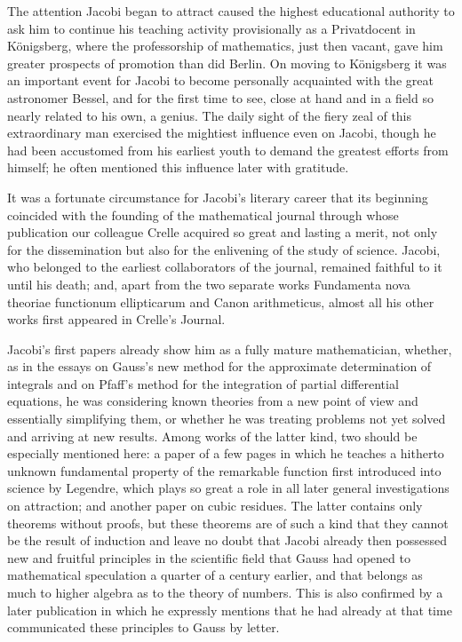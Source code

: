 \documentclass[11pt]{article}
\begin{document}
The attention Jacobi began to attract caused the highest educational authority to ask him to continue his teaching activity provisionally as a Privatdocent in Königsberg, where the professorship of mathematics, just then vacant, gave him greater prospects of promotion than did Berlin. On moving to Königsberg it was an important event for Jacobi to become personally acquainted with the great astronomer Bessel, and for the first time to see, close at hand and in a field so nearly related to his own, a genius. The daily sight of the fiery zeal of this extraordinary man exercised the mightiest influence even on Jacobi, though he had been accustomed from his earliest youth to demand the greatest efforts from himself; he often mentioned this influence later with gratitude.

It was a fortunate circumstance for Jacobi's literary career that its beginning coincided with the founding of the mathematical journal through whose publication our colleague Crelle acquired so great and lasting a merit, not only for the dissemination but also for the enlivening of the study of science. Jacobi, who belonged to the earliest collaborators of the journal, remained faithful to it until his death; and, apart from the two separate works Fundamenta nova theoriae functionum ellipticarum and Canon arithmeticus, almost all his other works first appeared in Crelle's Journal.

Jacobi's first papers already show him as a fully mature mathematician, whether, as in the essays on Gauss's new method for the approximate determination of integrals and on Pfaff's method for the integration of partial differential equations, he was considering known theories from a new point of view and essentially simplifying them, or whether he was treating problems not yet solved and arriving at new results. Among works of the latter kind, two should be especially mentioned here: a paper of a few pages in which he teaches a hitherto unknown fundamental property of the remarkable function first introduced into science by Legendre, which plays so great a role in all later general investigations on attraction; and another paper on cubic residues. The latter contains only theorems without proofs, but these theorems are of such a kind that they cannot be the result of induction and leave no doubt that Jacobi already then possessed new and fruitful principles in the scientific field that Gauss had opened to mathematical speculation a quarter of a century earlier, and that belongs as much to higher algebra as to the theory of numbers. This is also confirmed by a later publication in which he expressly mentions that he had already at that time communicated these principles to Gauss by letter.
\end{document}
